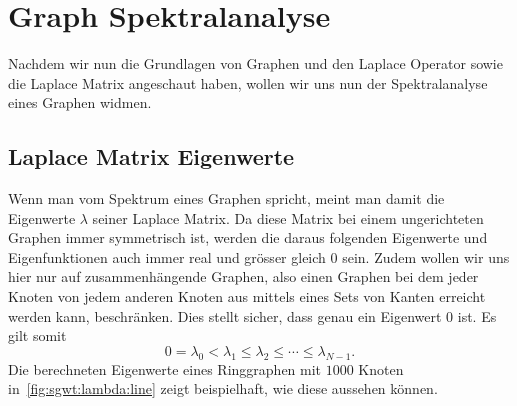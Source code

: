 
\section{Graph Spektralanalyse\label{sec:sgwt:spectralanalysis}}

Nachdem wir nun die Grundlagen von Graphen und den Laplace Operator sowie die 
Laplace Matrix angeschaut haben, wollen wir uns nun der Spektralanalyse eines 
Graphen widmen.

\subsection{Laplace Matrix Eigenwerte}

Wenn man vom Spektrum eines Graphen spricht, meint man damit die Eigenwerte 
$\lambda$ seiner Laplace Matrix. Da diese Matrix bei einem ungerichteten 
Graphen immer symmetrisch ist, werden die daraus folgenden Eigenwerte und 
Eigenfunktionen auch immer real und gr\"osser gleich $0$ sein. Zudem wollen wir 
uns hier nur auf zusammenh\"angende Graphen, also einen Graphen bei dem jeder 
Knoten von jedem anderen Knoten aus mittels eines Sets von Kanten erreicht 
werden kann, beschr\"anken. Dies stellt sicher, dass genau ein Eigenwert $0$ 
ist. Es gilt somit
\begin{equation}
0 = \lambda_0 < \lambda_1 \leq \lambda_2 \leq \cdots \leq \lambda_{N-1}.
\label{eq:sgwt:lambda:series}
\end{equation}
Die berechneten Eigenwerte eines Ringgraphen mit $1000$ Knoten 
in~\cref{fig:sgwt:lambda:line} zeigt beispielhaft, wie diese aussehen k\"onnen.

